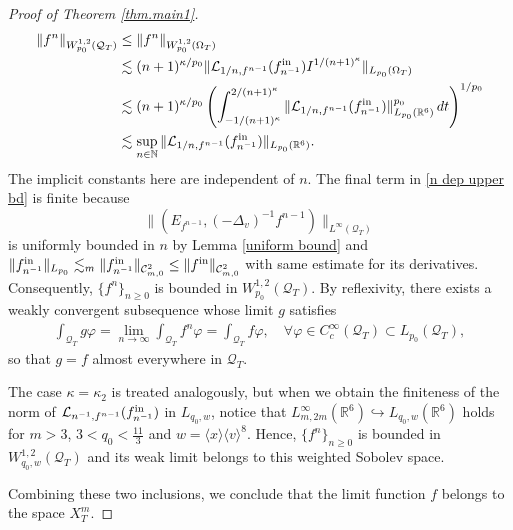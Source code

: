 \documentclass[reqno,11pt,final]{amsart}
\theoremstyle{plain}
\numberwithin{equation}{section}
\numberwithin{theorem}{section}
\begin{document}
\begin{proof}[Proof of Theorem \ref{thm.main1}]
\begin{align}\nonumber
    \|f^n\|_{W_{p_0}^{1,2}(\mathcal{Q}_T)} &\le \|f^n\|_{W_{p_0}^{1,2}(\Omega_T)}\\
    &\lesssim (n+1)^{\kappa/p_0} \| \mathcal{L}_{1/n,f^{n-1}}(f^\textup{in}_{n^{-1}})I^{1/(n+1)^{\kappa}}\|_{L_{p_0}(\Omega_T)}\nonumber\\
    &\lesssim (n+1)^{\kappa/ p_0}\left(\int_{-1/(n+1)^\kappa}^{2/(n+1)^{\kappa}} \|\mathcal{L}_{1/n,f^{n-1}}(f^\textup{in}_{n^{-1}})\|^{p_0}_{L_{p_0}(\mathbb{R}^6)}\,dt\right)^{1/p_0}\nonumber\\
    &\lesssim \sup_{n\in\mathbb{N}} \| \mathcal{L}_{1/n,f^{n-1}}(f^\textup{in}_{n^{-1}})\|_{L_{p_0}(\mathbb{R}^6)}.\label{n dep upper bd}
\end{align}The implicit constants here are independent of $n$. The final term in \eqref{n dep upper bd} is finite because $$\|(E_{f^{n-1}}, (-\Delta_v)^{-1}f^{n-1})\|_{L^\infty(\mathcal{Q}_T)}$$ is uniformly bounded in $n$ by Lemma \ref{uniform bound} and $\|f^\textup{in}_{n^{-1}}\|_{L_{p_0}} \lesssim_m \|f^\textup{in}_{n^{-1}}\|_{\mathcal{C}^2_{m,0}}\le\|f^\textup{in}\|_{\mathcal{C}^2_{m,0}}$ with same estimate for its derivatives. Consequently, $\{f^n\}_{n\ge0}$ is bounded in $W_{p_0}^{1,2}(\mathcal{Q}_T)$. By reflexivity, there exists a weakly convergent subsequence whose limit $g$ satisfies
\begin{align*}
    \int_{\mathcal{Q}_T} g \varphi= \lim_{n\to\infty} \int_{\mathcal{Q}_T}  f^n \varphi=\int_{\mathcal{Q}_T}f\varphi, \quad \forall \varphi\in C_c^\infty(\mathcal{Q}_T)\subset L_{p_0}(\mathcal{Q}_T),
\end{align*}so that $g=f$ almost everywhere in $\mathcal{Q}_T$. 

The case $\kappa=\kappa_2$ is treated analogously, but when we obtain the finiteness of the norm of $\mathcal{L}_{n^{-1},f^{n-1}}(f^\textup{in}_{n^{-1}})$ in $L_{q_0,w}$, notice that $L^\infty_{m,2m}(\mathbb{R}^6) \hookrightarrow L_{q_0,w}(\mathbb{R}^6)$ holds for $m>3$, $3<q_0<\frac{11}{3}$ and $w=\langle x\rangle\langle v\rangle^{8}$. Hence, $\{f^n\}_{n\ge0}$ is bounded in $W_{q_0,w}^{1,2}(\mathcal{Q}_T)$ and its weak limit belongs to this weighted Sobolev space.

Combining these two inclusions, we conclude that  the limit function $f$ belongs to the space $X_T^m$.


\end{proof}
\end{document}
